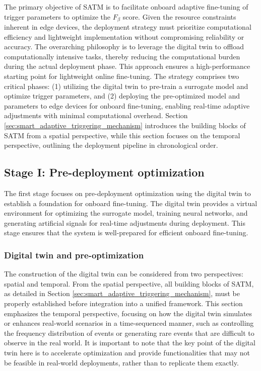 \documentclass[a4paper,fleqn,numbers,sort&compress]{cas-sc}
\begin{document}
The primary objective of SATM is to facilitate onboard adaptive fine-tuning of trigger parameters to optimize the $F_{\beta}$ score. Given the resource constraints inherent in edge devices, the deployment strategy must prioritize computational efficiency and lightweight implementation without compromising reliability or accuracy. The overarching philosophy is to leverage the digital twin to offload computationally intensive tasks, thereby reducing the computational burden during the actual deployment phase. This approach ensures a high-performance starting point for lightweight online fine-tuning. The strategy comprises two critical phases: (1) utilizing the digital twin to pre-train a surrogate model and optimize trigger parameters, and (2) deploying the pre-optimized model and parameters to edge devices for onboard fine-tuning, enabling real-time adaptive adjustments with minimal computational overhead. Section \ref{sec:smart_adaptive_triggering_mechanism} introduces the building blocks of SATM from a spatial perspective, while this section focuses on the temporal perspective, outlining the deployment pipeline in chronological order.

\subsection{Stage I: Pre-deployment optimization}

The first stage focuses on pre-deployment optimization using the digital twin to establish a foundation for onboard fine-tuning. The digital twin provides a virtual environment for optimizing the surrogate model, training neural networks, and generating artificial signals for real-time adjustments during deployment. This stage ensures that the system is well-prepared for efficient onboard fine-tuning. 

\subsubsection{Digital twin and pre-optimization}
\label{sec:digital_twin_pre-optimization}

The construction of the digital twin can be considered from two perspectives: spatial and temporal. From the spatial perspective, all building blocks of SATM, as detailed in Section \ref{sec:smart_adaptive_triggering_mechanism}, must be properly established before integration into a unified framework. This section emphasizes the temporal perspective, focusing on how the digital twin simulates or enhances real-world scenarios in a time-sequenced manner, such as controlling the frequency distribution of events or generating rare events that are difficult to observe in the real world. It is important to note that the key point of the digital twin here is to accelerate optimization and provide functionalities that may not be feasible in real-world deployments, rather than to replicate them exactly.
\end{document}
